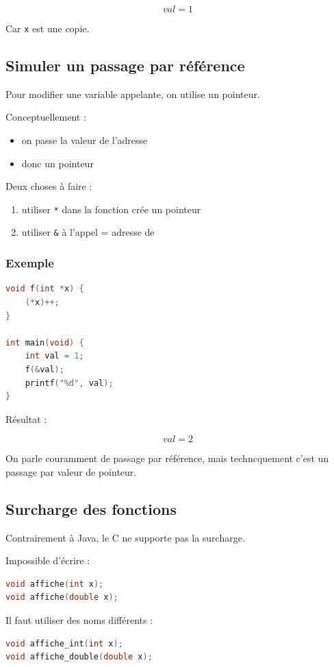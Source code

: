 \[
val = 1
\]

Car \texttt{x} est une copie.

\subsection{Simuler un passage par référence}

Pour modifier une variable appelante, on utilise un pointeur.

Conceptuellement :

\begin{itemize}
    \item on passe la valeur de l’adresse
    \item donc un pointeur
\end{itemize}

Deux choses à faire :

\begin{enumerate}
    \item utiliser \texttt{*} dans la fonction \textrightarrow crée un pointeur
    \item utiliser \texttt{\&} à l’appel = adresse de 
\end{enumerate}

\subsubsection{Exemple}

\begin{lstlisting}[language=C]
void f(int *x) {
    (*x)++;
}

int main(void) {
    int val = 1;
    f(&val);
    printf("%d", val);
}
\end{lstlisting}

Résultat :

\[
val = 2
\]

On parle couramment de passage par référence,
mais techncquement c’est un passage par valeur de pointeur.

\subsection{Surcharge des fonctions}

Contrairement à Java, le C ne supporte pas la surcharge.

Impossible d’écrire :

\begin{lstlisting}[language=C]
void affiche(int x);
void affiche(double x);
\end{lstlisting}

Il faut utiliser des noms différents :

\begin{lstlisting}[language=C]
void affiche_int(int x);
void affiche_double(double x);
\end{lstlisting}

